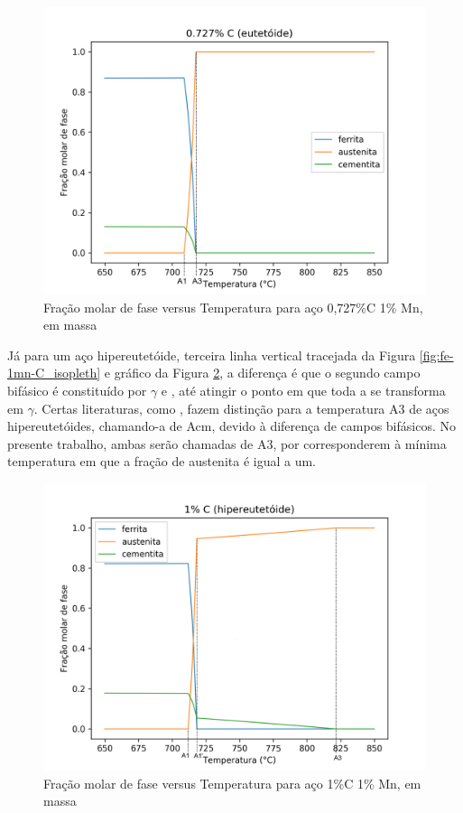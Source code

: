 \documentclass[brazil,tese,epusp]{usp}
\begin{document}
\begin{figure}[ht!]
  \includegraphics[width=1.1\textwidth]{img/Fe-Mn-0727C_edited.png}
  \caption{Fração molar de fase versus Temperatura para aço 0,727\%C 1\% Mn, em massa}
  \label{fig:fe-0727c-1mn}
\end{figure}

Já para um aço hipereutetóide, terceira linha vertical tracejada da Figura \ref{fig:fe-1mn-C_isopleth} e gráfico da Figura \ref{fig:fe-1c-1mn}, a diferença é que o segundo campo bifásico é constituído por $\gamma$ e , até atingir o ponto em que toda a  se transforma em $\gamma$. Certas literaturas, como , fazem distinção para a temperatura A3 de aços hipereutetóides, chamando-a de Acm, devido à diferença de campos bifásicos. No presente trabalho, ambas serão chamadas de A3, por corresponderem à mínima temperatura em que a fração de austenita é igual a um.

\begin{figure}[ht!]
  \includegraphics[width=1.1\textwidth]{img/Fe-Mn-1C_edited.png}
  \caption{Fração molar de fase versus Temperatura para aço 1\%C 1\% Mn, em massa}
  \label{fig:fe-1c-1mn}
\end{figure}
\end{document}
